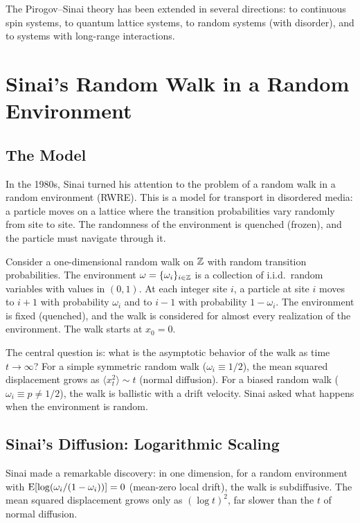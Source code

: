 The Pirogov--Sinai theory has been extended in several directions: to continuous spin systems, to quantum lattice systems, to random systems (with disorder), and to systems with long-range interactions.

\section{Sinai's Random Walk in a Random Environment}

\subsection{The Model}

In the 1980s, Sinai turned his attention to the problem of a random walk in a random environment (RWRE). This is a model for transport in disordered media: a particle moves on a lattice where the transition probabilities vary randomly from site to site. The randomness of the environment is quenched (frozen), and the particle must navigate through it.

\begin{definition}
Consider a one-dimensional random walk on \(\mathbb{Z}\) with random transition probabilities. The environment \(\omega = \{\omega_i\}_{i \in \mathbb{Z}}\) is a collection of i.i.d.\ random variables with values in \((0, 1)\). At each integer site \(i\), a particle at site \(i\) moves to \(i+1\) with probability \(\omega_i\) and to \(i-1\) with probability \(1 - \omega_i\). The environment is fixed (quenched), and the walk is considered for almost every realization of the environment. The walk starts at \(x_0 = 0\).
\end{definition}

The central question is: what is the asymptotic behavior of the walk as time \(t \to \infty\)? For a simple symmetric random walk (\(\omega_i \equiv 1/2\)), the mean squared displacement grows as \(\langle x_t^2 \rangle \sim t\) (normal diffusion). For a biased random walk (\(\omega_i \equiv p \neq 1/2\)), the walk is ballistic with a drift velocity. Sinai asked what happens when the environment is random.

\subsection{Sinai's Diffusion: Logarithmic Scaling}

Sinai made a remarkable discovery: in one dimension, for a random environment with \(\operatorname{E}[\log(\omega_i/(1-\omega_i))] = 0\) (mean-zero local drift), the walk is subdiffusive. The mean squared displacement grows only as \((\log t)^2\), far slower than the \(t\) of normal diffusion.

